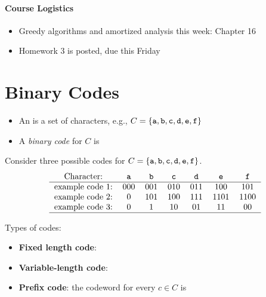 \documentclass[11  pt]{article}
\newcommand{\tta}{\tt{a}}
\newcommand{\ttb}{\tt{b}}
\newcommand{\ttc}{\tt{c}}
\newcommand{\tte}{\tt{e}}
\newcommand{\ttd}{\tt{d}}
\newcommand{\ttf}{\tt{f}}
\begin{document}
	
	
	
	\paragraph{Course Logistics}
	
	\begin{itemize}
		\item Greedy algorithms and amortized analysis this week: Chapter 16
		\item Homework 3 is posted, due this Friday
	\end{itemize}
	

\section{Binary Codes}

\begin{itemize}
	\item An  is a set of characters, e.g., $C = \{\tt{a},\tt{b}, \tt{c},\tt{d} ,\tt{e}, \ttf\}$ \\
	\item A \emph{binary code} for $C$ is\\ %
\end{itemize}

Consider three possible codes for $C = \{\tt{a},\tt{b}, \tt{c},\tt{d} ,\tt{e}, \ttf\}$.
\begin{equation}
	\label{tab1}
	\begin{tabular}{c c c c c c c}
		Character: &  \tta & \ttb & \ttc & \ttd & \tte & \ttf \\
		\hline
		example code 1: & 000 & 001 & 010 &  011 & 100 & 101 \\
		example code 2: &0 & 101 & 100 & 111 & 1101 & 1100 \\
		example code 3: &0 & 1 & 10 & 01 & 11 & 00 \\
		\hline
	\end{tabular} \\
\end{equation}

Types of codes:
\begin{itemize}
	\item \textbf{Fixed length code}: %
	\item \textbf{Variable-length code}: %
	\item \textbf{Prefix code}: the codeword for every $c \in C$ is %
\end{itemize}
\end{document}
